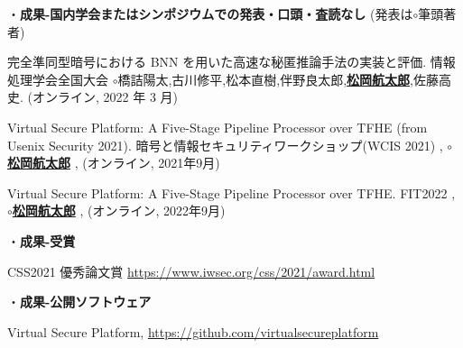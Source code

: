 \noindent・\textbf{成果-国内学会またはシンポジウムでの発表・口頭・査読なし} (発表は$\circ$筆頭著者)
\begin{enumerate}[label={[\arabic*]},ref=\arabic*,leftmargin=0.5cm]
    \setcounter{enumi}{4}
    \setlength{\parskip}{0cm} %
    \setlength{\itemsep}{0cm} %
     \item  完全準同型暗号における BNN を用いた高速な秘匿推論手法の実装と評価. 情報処理学会全国大会 $\circ$橋詰陽太,古川修平,松本直樹,伴野良太郎,\underline{\textbf{松岡航太郎}},佐藤高史. (オンライン, 2022 年 3 月)\label{achieve:bnn}
	\item  Virtual Secure Platform: A Five-Stage Pipeline Processor over TFHE (from Usenix Security 2021). 暗号と情報セキュリティワークショップ(WCIS 2021) , $\circ$\underline{\textbf{松岡航太郎}} \etal, (オンライン, 2021年9月) \label{achieve:wcis}
	\item  Virtual Secure Platform: A Five-Stage Pipeline Processor over TFHE. FIT2022 , $\circ$\underline{\textbf{松岡航太郎}} \etal, (オンライン, 2022年9月)\label{achieve:fit}
\end{enumerate}


\noindent・\textbf{成果-受賞}
\begin{enumerate}[label={[\arabic*]},ref=\arabic*,leftmargin=0.5cm]
    \setcounter{enumi}{7}
    \setlength{\parskip}{0cm} %
    \setlength{\itemsep}{0cm} %
	\label{achieve:mitou}
	\label{achieve:nhk}
	\label{achieve:vsp}
	\item CSS2021 優秀論文賞 \url{https://www.iwsec.org/css/2021/award.html} \label{achieve:css}
\end{enumerate}


\noindent・\noindent\textbf{成果-公開ソフトウェア}
\begin{enumerate}[label={[\arabic*]},ref=\arabic*,leftmargin=0.5cm]
    \setcounter{enumi}{11}
    \setlength{\parskip}{0cm} %
    \setlength{\itemsep}{0cm} %
	\item Virtual Secure Platform, \url{https://github.com/virtualsecureplatform}\label{code:vsp}
\end{enumerate}

